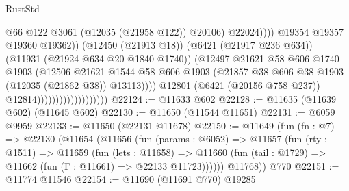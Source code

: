 \begin{lexlean}{RustStd}
\begin{coremodule}
                                                          @66
                                                          @122
                                                          @3061
                                                          (@12035 (@21958 @122))
                                                          @20106)
                                                        @22024))))
                                                @19354
                                                @19357
                                                @19360
                                                @19362))
                                            (@12450 (@21913 @18))
                                            (@6421 (@21917 @236 @634))
                                            (@11931 (@21924 @634 @20 @1840 @1740))
                                            (@12497
                                              @21621
                                              @58
                                              @606
                                              @1740
                                              @1903
                                              (@12506
                                                @21621
                                                @1544
                                                @58
                                                @606
                                                @1903
                                                (@21857
                                                  @38
                                                  @606
                                                  @38
                                                  @1903
                                                  (@12035 (@21862 @38))
                                                  @13113))))
                                          @12801
                                          (@6421 (@20156 @758 @237))
                                          @12814)))))))))))))))))))
@22124 := @11633 @602
@22128 := @11635 (@11639 @602) (@11645 @602)
@22130 := @11650 (@11544 @11651)
@22131 := @6059 @9959
@22133 := @11650 (@22131 @11678)
@22150 := @11649
    (fun (fn : @7) =>
    @22130
      (@11654
        (@11656
          (fun (params : @6052) =>
          @11657
            (fun (rty : @1511) =>
            @11659
              (fun (lets : @11658) =>
              @11660 (fun (tail : @1729) => @11662 (fun (Γ : @11661) => @22133 @11723))))))
        @11768))
    @770
@22151 := @11774 @11546
@22154 := @11690 (@11691 @770) @19285

\end{coremodule}
\end{lexlean}
